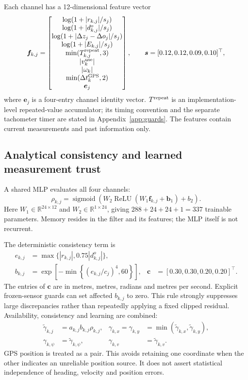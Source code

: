 ﻿\documentclass[10pt,a4paper]{article}
\newcommand{\relu}{\operatorname{ReLU}}
\newcommand{\sigmoid}{\operatorname{sigmoid}}
\begin{document}
Each channel has a 12-dimensional feature vector
\begin{equation}
 \bm f_{k,j}=
 \begin{bmatrix}
 \log(1+|r_{k,j}|/s_j)\\
 \log(1+|d^o_{k,j}|/s_j)\\
 \log(1+|\Delta z_j-\Delta o_j|/s_j)\\
 \log(1+|E_{k,j}|/s_j)\\
 \min(T^{\rm repeat}_{k,j},3)\\
 |v_k^{\rm use}|\\
 |\omega_k|\\
 \min(\Delta t_k^{\rm GPS},2)\\
 \bm e_j
 \end{bmatrix},
 \qquad \bm s=[0.12,0.12,0.09,0.10]^\top ,
 \label{eq:features}
\end{equation}
where $\bm e_j$ is a four-entry channel identity vector.
$T^{\rm repeat}$ is an implementation-level repeated-value accumulator; its timing
convention and the separate tachometer timer are stated in Appendix~\ref{app:guards}.
The features contain current measurements and past information only.

\subsection{Analytical consistency and learned measurement trust}
A shared MLP evaluates all four channels:
\begin{equation}
 \rho_{k,j}=\sigmoid\!\left(W_2\relu(W_1\bm f_{k,j}+\bm b_1)+b_2\right).
 \label{eq:mlp}
\end{equation}
Here $W_1\in\mathbb R^{24\times12}$ and $W_2\in\mathbb R^{1\times24}$,
giving $288+24+24+1=337$ trainable parameters.
Memory resides in the filter and its features; the MLP itself is not recurrent.

The deterministic consistency term is
\begin{align}
 e_{k,j}&=\max\{|r_{k,j}|,0.75|d^o_{k,j}|\},\nonumber\\
 b_{k,j}&=\exp\!\left[-\min\left\{(e_{k,j}/c_j)^4,60\right\}\right],
 & \bm c&=[0.30,0.30,0.20,0.20]^\top .
 \label{eq:prior}
\end{align}
The entries of $\bm c$ are in metres, metres, radians and metres per second.
Explicit frozen-sensor guards can set affected $b_{k,j}$ to zero.
This rule strongly suppresses large discrepancies rather than repeatedly applying
a fixed clipped residual. Availability, consistency and learning are combined:
\begin{align}
 \tilde\gamma_{k,j}&=a_{k,j}b_{k,j}\rho_{k,j},&
 \gamma_{k,x}=\gamma_{k,y}&=\min(\tilde\gamma_{k,x},\tilde\gamma_{k,y}),\nonumber\\
 \gamma_{k,\psi}&=\tilde\gamma_{k,\psi},&
 \gamma_{k,v}&=\tilde\gamma_{k,v}.
 \label{eq:trust}
\end{align}
GPS position is treated as a pair. This avoids retaining one coordinate when the
other indicates an unreliable position source. It does not assert statistical
independence of heading, velocity and position errors.
\end{document}
